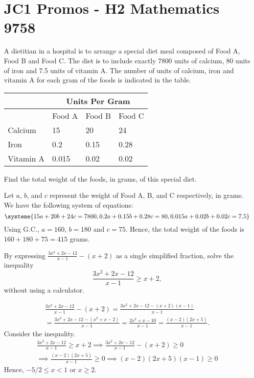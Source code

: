 \section{JC1 Promos - H2 Mathematics 9758}

\begin{problem}
    A dietitian in a hospital is to arrange a special diet meal composed of Food A, Food B and Food C. The diet is to include exactly 7800 units of calcium, 80 units of iron and 7.5 units of vitamin A. The number of units of calcium, iron and vitamin A for each gram of the foods is indicated in the table.

    \begin{table}[H]
        \centering
        \begin{tabular}{|l|l|l|l|}
        \hline
        & \multicolumn{3}{|c|}{Units Per Gram} \\\hline
        & Food A & Food B & Food C \\\hline
        Calcium & 15 & 20 & 24 \\\hline
        Iron & 0.2 & 0.15 & 0.28 \\\hline
        Vitamin A & 0.015 & 0.02 & 0.02\\\hline
        \end{tabular}
    \end{table}

    Find the total weight of the foods, in grams, of this special diet.
\end{problem}
\begin{solution}
    Let $a$, $b$, and $c$ represent the weight of Food A, B, and C respectively, in grams. We have the following system of equations: \[\systeme{15a + 20b + 24c = 7800,0.2a+0.15b+0.28c=80,0.015a+0.02b+0.02c = 7.5}\] Using G.C., $a=160$, $b=180$ and $c=75$. Hence, the total weight of the foods is $160 + 180 + 75 = 415$ grams.
\end{solution}

\begin{problem}
    By expressing $\frac{3x^2 + 2x - 12}{x-1} - (x+2)$ as a single simplified fraction, solve the inequality \[\frac{3x^2 + 2x - 12}{x-1} \geq x + 2,\] without using a calculator.
\end{problem}
\begin{solution}
    \begin{gather*}
        \frac{3x^2+2x-12}{x-1} - (x+2) = \frac{3x^2 + 2x - 12 - (x+2)(x-1)}{x-1}\\
        = \frac{3x^2 + 2x - 12 - (x^2 + x - 2)}{x-1} = \frac{2x^2 + x - 10}{x-1} = \frac{(x-2)(2x+5)}{x-1}.
    \end{gather*}
    Consider the inequality.
    \begin{gather*}
        \frac{3x^2 + 2x - 12}{x-1} \geq x + 2 \implies \frac{3x^2 + 2x - 12}{x-1} - (x+2) \geq 0\\
        \implies \frac{(x-2)(2x+5)}{x-1} \geq 0 \implies (x-2)(2x+5)(x-1) \geq 0
    \end{gather*}
    Hence, $-5/2 \leq x < 1$ or $x \geq 2$.
\end{solution}

